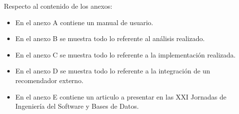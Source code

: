 Respecto al contenido de los anexos:

\begin{itemize}
	\item En el anexo A contiene un manual de usuario.
	\item En el anexo B se muestra todo lo referente al análisis realizado.
	\item En el anexo C se muestra todo lo referente a la implementación realizada.
	\item En el anexo D se muestra todo lo referente a la integración de un recomendador externo.
	\item En el anexo E contiene un articulo a presentar en las XXI Jornadas de Ingeniería del Software y Bases de Datos.
\end{itemize}